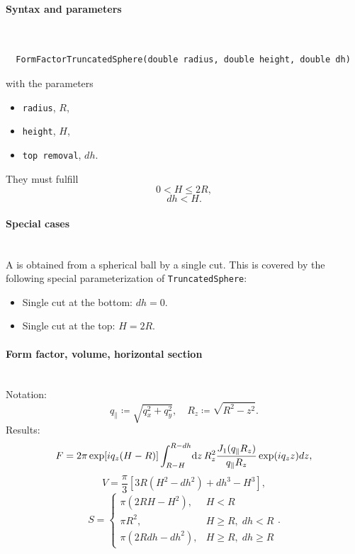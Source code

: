 \paragraph{Syntax and parameters}\strut\\[-2ex plus .2ex minus .2ex]
\begin{lstlisting}
  FormFactorTruncatedSphere(double radius, double height, double dh)
\end{lstlisting}
with the parameters
\begin{itemize}
\item \texttt{radius}, $R$,
\item \texttt{height}, $H$,
\item \texttt{top removal}, $dh$.
\end{itemize}
They must fulfill
\begin{equation*}
   0 < H\leq 2R,
\end{equation*}
\begin{equation*}
  dh < H.
\end{equation*}

\paragraph{Special cases}\strut\\
%
%
A  is obtained from a spherical ball by a single cut.
This is covered by the following special parameterization of \texttt{TruncatedSphere}:
\begin{itemize}
\item Single cut at the bottom: $dh=0$.
\item Single cut at the top: $H=2R$.
\end{itemize}

\paragraph{Form factor, volume, horizontal section}\strut\\
Notation:
\begin{equation*}
  q_{\parallel} \coloneqq \sqrt{q_x^2+q_y^2},\quad
  R_z \coloneqq \sqrt{R^2-z^2}.
\end{equation*}
Results:
\begin{equation*}
F= 2\pi \exp[i q_z (H-R)]\int_{R-H}^{R-dh}\!\mathrm d z\, R_z^2
       \frac{J_1(q_{\parallel} R_z) }{q_{\parallel} R_z} \exp(i q_z z) dz,
\end{equation*}
\begin{equation*}
  V=\frac{\pi}{3} \left[ 3R\left(H^2-dh^2\right) +dh^3 - H^3 \right],
\end{equation*}
\begin{equation*}
  S = \left\{\begin{array}{ll} \pi\left(2RH-H^2\right), & H < R \\
                               \pi R^2, & H \geq R,\; dh < R \\
                               \pi\left(2Rdh-dh^2\right), & H \geq R,\; dh \geq R
                                 \end{array}\right..
\end{equation*}

